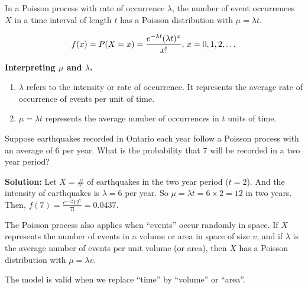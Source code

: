 In a Poisson process with rate of occurrence $\lambda$, the number of event occurrences $X$ in a time interval of length $t$
has a Poisson distribution with $\mu = \lambda t$.

\[f(x) = P(X=x) = \displaystyle \frac{e^{-\lambda t} (\lambda t)^x}{x!} \text{, $x=0,1,2,\ldots$}\]


\textbf{Interpreting $\mu$ and $\lambda$.}
\begin{enumerate}
    \item $\lambda$ refers to the intensity or rate of occurrence. It represents the average rate of occurrence of events per unit of time.
    \item $\mu = \lambda t$ represents the average number of occurrences in $t$ units of time. \\
\end{enumerate}


\begin{example}
    Suppose earthquakes recorded in Ontario each year follow a Poisson process with an average of 6 per year.
    What is the probability that 7 will be recorded in a two year period?

    \textbf{Solution:} Let $X = \#$ of earthquakes in the two year period ($t = 2$). And the intensity of earthquakes is $\lambda = 6$ per year.
    So $\mu = \lambda t = 6 \times 2 = 12$ in two years. Then, $f(7) = \frac{e^{-12} 12^7}{7!} = 0.0437$. \\
\end{example}


The Poisson process also applies when ``events'' occur randomly in space. If $X$ represents the number of events in a volume or area in space of size $v$,
and if $\lambda$ is the average number of events per unit volume (or area), then $X$ has a Poisson distribution with $\mu = \lambda v$.

The model is valid when we replace ``time'' by ``volume'' or ``area''.

\pagebreak

